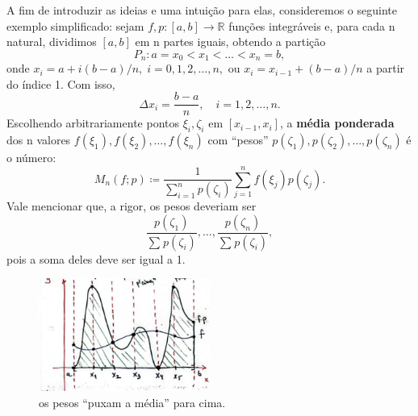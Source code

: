 \documentclass[../distribution_theory_notes.tex]{subfiles}
\begin{document}
  A fim de introduzir as ideias e uma intuição para elas, consideremos o seguinte exemplo simplificado: sejam \(f, p:[a, b]\rightarrow \mathbb{R}\) funções integráveis e, para cada n natural, dividimos \([a, b]\) em n partes iguais, obtendo a partição 
    \[
      P_{n}: a=x_{0}<x_1<\dotsc <x_{n}=b,
    \]
    onde \(x_{i}=a + i (b-a)/n,\; i = 0,1,2,\dotsc ,n,\) ou \(x_{i}=x_{i-1}+(b-a)/n\) a partir do índice 1. Com isso, 
      \[
        \Delta x_{i}=\frac{b-a}{n},\quad i=1,2,\dotsc ,n.
      \]
      Escolhendo arbitrariamente pontos  \(\xi_{i}, \zeta_{i}\) em \([x_{i-1}, x_{i}]\), a \textbf{média ponderada} dos n valores \(f(\xi_1), f(\xi_2),\dotsc , f(\xi_{n})\) com ``pesos'' \(p(\zeta_1), p(\zeta_2), \dotsc , p(\zeta_{n})\) é o número: 
        \[
          M_{n}(f; p) \coloneqq \frac{1}{\sum\limits_{i=1}^{n}p(\zeta_{i})}\sum\limits_{j=1}^{n}f(\xi_{j})p(\zeta_{j}).
        \]
        Vale mencionar que, a rigor, os pesos deveriam ser 
          \[
            \frac{p(\zeta_1)}{\sum\limits_{}^{}p(\zeta_{i})}, \dotsc , \frac{p(\zeta_{n})}{\sum\limits_{}^{}p(\zeta_{i})},
          \]
          pois a soma deles deve ser igual a 1. 
         \begin{figure}[H]
         \begin{center}
         \includegraphics[height=0.5\textheight, width=0.5\textwidth, keepaspectratio]{./Images/weighted_avg_08.png}
         \end{center}
         \caption{os pesos ``puxam a média'' para cima.}
         \end{figure}
\end{document}

